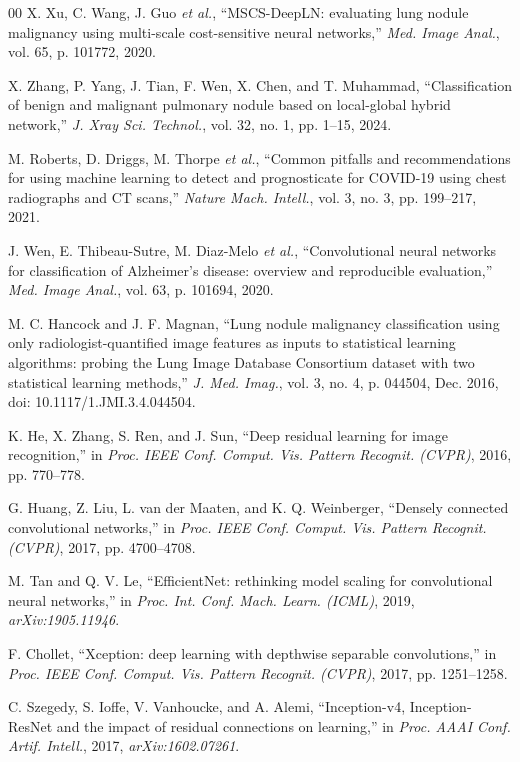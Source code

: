\documentclass{ieeeaccess}
\begin{document}
\begin{thebibliography}{00}
 X. Xu, C. Wang, J. Guo \textit{et al.}, ``MSCS-DeepLN: evaluating lung nodule malignancy using multi-scale cost-sensitive neural networks,'' \textit{Med. Image Anal.}, vol. 65, p. 101772, 2020.

 X. Zhang, P. Yang, J. Tian, F. Wen, X. Chen, and T. Muhammad, ``Classification of benign and malignant pulmonary nodule based on local-global hybrid network,'' \textit{J. Xray Sci. Technol.}, vol. 32, no. 1, pp. 1--15, 2024.

 M. Roberts, D. Driggs, M. Thorpe \textit{et al.}, ``Common pitfalls and recommendations for using machine learning to detect and prognosticate for COVID-19 using chest radiographs and CT scans,'' \textit{Nature Mach. Intell.}, vol. 3, no. 3, pp. 199--217, 2021.

 J. Wen, E. Thibeau-Sutre, M. Diaz-Melo \textit{et al.}, ``Convolutional neural networks for classification of Alzheimer's disease: overview and reproducible evaluation,'' \textit{Med. Image Anal.}, vol. 63, p. 101694, 2020.

 M. C. Hancock and J. F. Magnan, ``Lung nodule malignancy classification using only radiologist-quantified image features as inputs to statistical learning algorithms: probing the Lung Image Database Consortium dataset with two statistical learning methods,'' \textit{J. Med. Imag.}, vol. 3, no. 4, p. 044504, Dec. 2016, doi: 10.1117/1.JMI.3.4.044504.

 K. He, X. Zhang, S. Ren, and J. Sun, ``Deep residual learning for image recognition,'' in \textit{Proc. IEEE Conf. Comput. Vis. Pattern Recognit. (CVPR)}, 2016, pp. 770--778.

 G. Huang, Z. Liu, L. van der Maaten, and K. Q. Weinberger, ``Densely connected convolutional networks,'' in \textit{Proc. IEEE Conf. Comput. Vis. Pattern Recognit. (CVPR)}, 2017, pp. 4700--4708.

 M. Tan and Q. V. Le, ``EfficientNet: rethinking model scaling for convolutional neural networks,'' in \textit{Proc. Int. Conf. Mach. Learn. (ICML)}, 2019, \textit{arXiv:1905.11946}.

 F. Chollet, ``Xception: deep learning with depthwise separable convolutions,'' in \textit{Proc. IEEE Conf. Comput. Vis. Pattern Recognit. (CVPR)}, 2017, pp. 1251--1258.

 C. Szegedy, S. Ioffe, V. Vanhoucke, and A. Alemi, ``Inception-v4, Inception-ResNet and the impact of residual connections on learning,'' in \textit{Proc. AAAI Conf. Artif. Intell.}, 2017, \textit{arXiv:1602.07261}.


\end{thebibliography}
\end{document}
